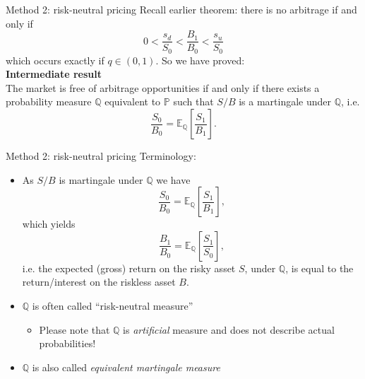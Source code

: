 \documentclass[pdf, handout]{beamer}
\begin{document}
\begin{frame}{Method 2: risk-neutral pricing}
Recall earlier theorem: there is no arbitrage if and only if
\[
0<\frac{s_d}{S_0}<\frac{B_1}{B_0}<\frac{s_u}{S_0}
\]
which occurs exactly if $q\in (0,1)$. So we have proved:
\\
\vspace{.3cm}
\textbf{Intermediate result} \\
The market is free of arbitrage opportunities if and only if there exists a probability measure $\mathbb{Q}$ equivalent to $\mathbb{P}$
 such that $S/B$ is a martingale under $\mathbb{Q}$, i.e.
\[ 
 \frac{S_0}{B_0} =\mathbb{E}_{\mathbb{Q}}[ \frac{S_1}{B_1} ].
\]
\end{frame}

\begin{frame}{Method 2: risk-neutral pricing}
Terminology:
\begin{itemize}
\item As $S/B$ is martingale under $\mathbb{Q}$ we have
\[
\frac{S_0}{B_0}=\mathbb{E}_{\mathbb{Q}}\left[ \frac{S_1}{B_1}\right],
\]
which yields
\[
\frac{B_1}{B_0} =\mathbb{E}_{\mathbb{Q}} \left[ \frac{S_1}{S_0} \right] ,
\]
i.e. the expected (gross) return on the risky asset $S$, under $\mathbb{Q}$, is equal to the return/interest on the riskless asset $B$.
\item $\mathbb{Q}$ is often called ``risk-neutral measure''
\begin{itemize}
\item Please note that $\mathbb{Q}$ is \emph{artificial} measure and does not describe actual probabilities!
\end{itemize}
\item $\mathbb{Q}$ is also called \emph{equivalent martingale measure}
\end{itemize}
\end{frame}
\end{document}
